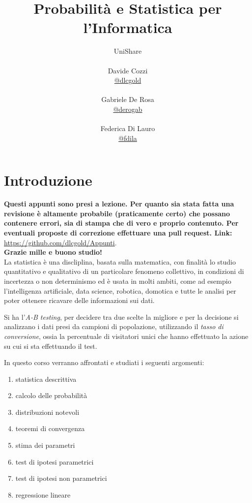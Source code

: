 \documentclass[a4paper,12pt, oneside]{book}
\title{Probabilità e Statistica per l'Informatica}
\author{UniShare\\\\Davide Cozzi\\\href{https://t.me/dlcgold}{@dlcgold}\\\\Gabriele De Rosa\\\href{https://t.me/derogab}{@derogab} \\\\Federica Di Lauro\\\href{https://t.me/f_dila}{@f\textunderscore dila}}
\date{}
\begin{document}
\maketitle
\tableofcontents


\newtheorem{teo}{Teorema}
\newtheorem{definizione}{Definizione}
\newtheorem{esempio}{Esempio}
\newtheorem{corollario}{Corollario}
\newtheorem{lemma}{Lemma}
\newtheorem{osservazione}{Osservazione}
\newtheorem{nota}{Nota}
\newtheorem{esercizio}{Esercizio}
\newcommand{\mean}[1]{\overline #1}
\renewcommand{\chaptermark}[1]{%
\markboth{\chaptername
\ \thechapter.\ #1}{}}
\renewcommand{\sectionmark}[1]{\markright{\thesection.\ #1}}
\chapter{Introduzione}
\textbf{Questi appunti sono presi a lezione. Per quanto sia stata fatta una revisione è altamente probabile (praticamente certo) che possano contenere errori, sia di stampa che di vero e proprio contenuto. Per eventuali proposte di correzione effettuare una pull request. Link: } \url{https://github.com/dlcgold/Appunti}.\\
\textbf{Grazie mille e buono studio!}
\\
La statistica è una discliplina, basata sulla matematica, con finalità lo studio quantitativo e qualitativo
di un particolare fenomeno collettivo, in condizioni di incertezza o non determinismo ed è usata in molti 
ambiti, come ad esempio l'intelligenza artificiale, data science, robotica, domotica e tutte le analisi 
per poter ottenere ricavare delle informazioni sui dati.

Si ha l'\emph{A-B testing}, per decidere tra due scelte la migliore e per la decisione si analizzano i dati
presi da campioni di popolazione, utilizzando il \emph{tasso di conversione}, ossia la percentuale di visitatori unici
che hanno effettuato la azione su cui si sta effettuando il test.

In questo corso verranno affrontati e studiati i seguenti argomenti:
\begin{enumerate}
    \item statistica descrittiva
    \item calcolo delle probabilità
    \item distribuzioni notevoli
    \item teoremi di convergenza
    \item stima dei parametri
    \item test di ipotesi parametrici
    \item test di ipotesi non parametrici
    \item regressione lineare
\end{enumerate}
\end{document}
